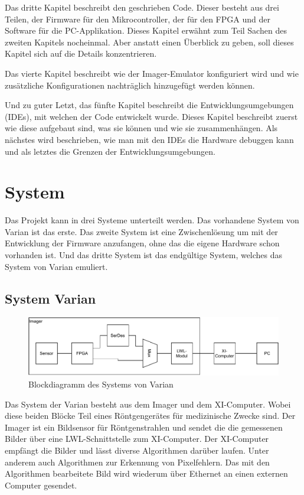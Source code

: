 \documentclass{article}
\begin{document}
Das dritte Kapitel beschreibt den geschrieben Code. Dieser besteht aus drei Teilen, der Firmware für den Mikrocontroller, der für den FPGA und der Software für die PC-Applikation. Dieses Kapitel erwähnt zum Teil Sachen des zweiten Kapitels nocheinmal. Aber anstatt einen Überblick zu geben, soll dieses Kapitel sich auf die Details konzentrieren.

Das vierte Kapitel beschreibt wie der Imager-Emulator konfiguriert wird und wie zusätzliche Konfigurationen nachträglich hinzugefügt werden können.

Und zu guter Letzt, das fünfte Kapitel beschreibt die Entwicklungsumgebungen (IDEs), mit welchen der Code entwickelt wurde. Dieses Kapitel beschreibt zuerst wie diese aufgebaut sind, was sie können und wie sie zusammenhängen. Als nächstes wird beschrieben, wie man mit den IDEs die Hardware debuggen kann und als letztes die Grenzen der Entwicklungsumgebungen.

\clearpage
\section{System}
Das Projekt kann in drei Systeme unterteilt werden. Das vorhandene System von Varian ist das erste. Das zweite System ist eine Zwischenlösung um mit der Entwicklung der Firmware anzufangen, ohne das die eigene Hardware schon vorhanden ist. Und das dritte System ist das endgültige System, welches das System von Varian emuliert.

\subsection{System Varian}
\begin{figure}[tb]
    \includegraphics[width=\linewidth]{drawio/bd_varian}
    \caption{Blockdiagramm des Systems von Varian}
    \label{fig:bd_varian}
\end{figure}

Das System der Varian besteht aus dem Imager und dem XI-Computer. Wobei diese beiden Blöcke Teil eines Röntgengerätes für medizinische Zwecke sind. Der Imager ist ein Bildsensor für Röntgenstrahlen und sendet die die gemessenen Bilder über eine LWL-Schnittstelle zum XI-Computer. Der XI-Computer empfängt die Bilder und lässt diverse Algorithmen darüber laufen. Unter anderem auch Algorithmen zur Erkennung von Pixelfehlern. Das mit den Algorithmen bearbeitete Bild wird wiederum über Ethernet an einen externen Computer gesendet.
\end{document}
